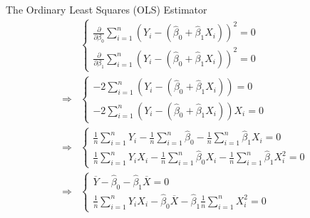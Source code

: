 \documentclass[notes,10pt, aspectratio=169]{beamer}
\begin{document}
\begin{frame}{The Ordinary Least Squares (OLS) Estimator}
\begin{eqnarray*}
    &\begin{cases}
    \frac{\partial}{\partial \beta_0} \sum_{i=1}^n (Y_i - (\hat{\beta}_0 + \hat{\beta}_1 X_i))^2 = 0\\
    \frac{\partial}{\partial \beta_1} \sum_{i=1}^n (Y_i - (\hat{\beta}_0 + \hat{\beta}_1 X_i))^2 = 0
    \end{cases}\\ 
    \Rightarrow
    &\begin{cases}
    -2 \sum_{i=1}^n (Y_i - (\hat{\beta}_0 + \hat{\beta}_1 X_i)) = 0\\
    -2 \sum_{i=1}^n (Y_i - (\hat{\beta}_0 + \hat{\beta}_1 X_i))X_i = 0
    \end{cases}\\ 
    \Rightarrow
    &\begin{cases}
    \frac{1}{n}\sum_{i=1}^n Y_i - \frac{1}{n}\sum_{i=1}^n\hat{\beta}_0 -\frac{1}{n}\sum_{i=1}^n \hat{\beta}_1 X_i = 0\\
    \frac{1}{n}\sum_{i=1}^n Y_iX_i - \frac{1}{n}\sum_{i=1}^n\hat{\beta}_0X_i -\frac{1}{n}\sum_{i=1}^n \hat{\beta}_1 X_i^2 = 0
    \end{cases}\\ 
    \Rightarrow
    &\begin{cases}
    \overline{Y} - \hat{\beta}_0 -\hat{\beta}_1 \overline{X} = 0\\
    \frac{1}{n}\sum_{i=1}^n Y_iX_i - \hat{\beta}_0 \overline{X} - \hat{\beta}_1  \frac{1}{n}\sum_{i=1}^n X_i^2 = 0
    \end{cases}\\ 
\end{eqnarray*}
\end{frame}
\end{document}

